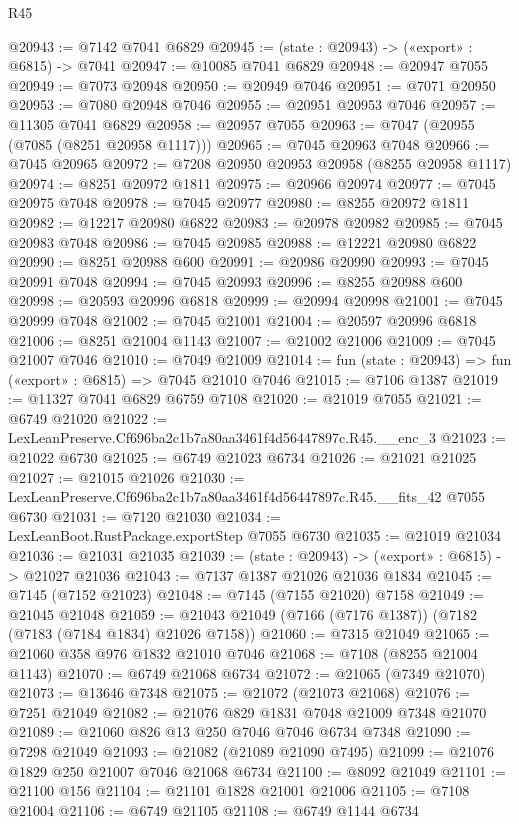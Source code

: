 \begin{lexlean}{R45}
\begin{coremodule}
{@20943 := @7142 @7041 @6829
@20945 := (state : @20943) -> («export» : @6815) -> @7041
@20947 := @10085 @7041 @6829
@20948 := @20947 @7055
@20949 := @7073 @20948
@20950 := @20949 @7046
@20951 := @7071 @20950
@20953 := @7080 @20948 @7046
@20955 := @20951 @20953 @7046
@20957 := @11305 @7041 @6829
@20958 := @20957 @7055
@20963 := @7047 (@20955 (@7085 (@8251 @20958 @1117)))
@20965 := @7045 @20963 @7048
@20966 := @7045 @20965
@20972 := @7208 @20950 @20953 @20958 (@8255 @20958 @1117)
@20974 := @8251 @20972 @1811
@20975 := @20966 @20974
@20977 := @7045 @20975 @7048
@20978 := @7045 @20977
@20980 := @8255 @20972 @1811
@20982 := @12217 @20980 @6822
@20983 := @20978 @20982
@20985 := @7045 @20983 @7048
@20986 := @7045 @20985
@20988 := @12221 @20980 @6822
@20990 := @8251 @20988 @600
@20991 := @20986 @20990
@20993 := @7045 @20991 @7048
@20994 := @7045 @20993
@20996 := @8255 @20988 @600
@20998 := @20593 @20996 @6818
@20999 := @20994 @20998
@21001 := @7045 @20999 @7048
@21002 := @7045 @21001
@21004 := @20597 @20996 @6818
@21006 := @8251 @21004 @1143
@21007 := @21002 @21006
@21009 := @7045 @21007 @7046
@21010 := @7049 @21009
@21014 := fun (state : @20943) => fun («export» : @6815) => @7045 @21010 @7046
@21015 := @7106 @1387
@21019 := @11327 @7041 @6829 @6759 @7108
@21020 := @21019 @7055
@21021 := @6749 @21020
@21022 := LexLeanPreserve.Cf696ba2c1b7a80aa3461f4d56447897c.R45.__enc_3
@21023 := @21022 @6730
@21025 := @6749 @21023 @6734
@21026 := @21021 @21025
@21027 := @21015 @21026
@21030 := LexLeanPreserve.Cf696ba2c1b7a80aa3461f4d56447897c.R45.__fits_42 @7055 @6730
@21031 := @7120 @21030
@21034 := LexLeanBoot.RustPackage.exportStep @7055 @6730
@21035 := @21019 @21034
@21036 := @21031 @21035
@21039 := (state : @20943) -> («export» : @6815) -> @21027 @21036
@21043 := @7137 @1387 @21026 @21036 @1834
@21045 := @7145 (@7152 @21023)
@21048 := @7145 (@7155 @21020) @7158
@21049 := @21045 @21048
@21059 := @21043 @21049 (@7166 (@7176 @1387)) (@7182 (@7183 (@7184 @1834) @21026 @7158))
@21060 := @7315 @21049
@21065 := @21060 @358 @976 @1832 @21010 @7046
@21068 := @7108 (@8255 @21004 @1143)
@21070 := @6749 @21068 @6734
@21072 := @21065 (@7349 @21070)
@21073 := @13646 @7348
@21075 := @21072 (@21073 @21068)
@21076 := @7251 @21049
@21082 := @21076 @829 @1831 @7048 @21009 @7348 @21070
@21089 := @21060 @826 @13 @250 @7046 @7046 @6734 @7348
@21090 := @7298 @21049
@21093 := @21082 (@21089 @21090 @7495)
@21099 := @21076 @1829 @250 @21007 @7046 @21068 @6734
@21100 := @8092 @21049
@21101 := @21100 @156
@21104 := @21101 @1828 @21001 @21006
@21105 := @7108 @21004
@21106 := @6749 @21105
@21108 := @6749 @1144 @6734
}
\end{coremodule}
\end{lexlean}
